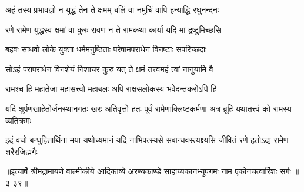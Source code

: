 \twolineshloka
{अहं तस्य प्रभावज्ञो न युद्धं तेन ते क्षमम्}
{बलिं वा नमुचिं वापि हन्याद्धि रघुनन्दनः} %

\twolineshloka
{रणे रामेण युद्धस्व क्षमां वा कुरु रावण}
{न ते रामकथा कार्या यदि मां द्रष्टुमिच्छसि} %

\twolineshloka
{बहवः साधवो लोके युक्ता धर्ममनुष्ठिताः}
{परेषामपराधेन विनष्टाः सपरिच्छदाः} %

\twolineshloka
{सोऽहं परापराधेन विनशेयं निशाचर}
{कुरु यत् ते क्षमं तत्त्वमहं त्वां नानुयामि वै} %

\twolineshloka
{रामश्च हि महातेजा महासत्त्वो महाबलः}
{अपि राक्षसलोकस्य भवेदन्तकरोऽपि हि} %

\threelineshloka
{यदि शूर्पणखाहेतोर्जनस्थानगतः खरः}
{अतिवृत्तो हतः पूर्वं रामेणाक्लिष्टकर्मणा}
{अत्र ब्रूहि यथातत्त्वं को रामस्य व्यतिक्रमः} %

\twolineshloka
{इदं वचो बन्धुहितार्थिना मया यथोच्यमानं यदि नाभिपत्स्यसे}
{सबान्धवस्त्यक्ष्यसि जीवितं रणे हतोऽद्य रामेण शरैरजिह्मगैः} %


॥इत्यार्षे श्रीमद्रामायणे वाल्मीकीये आदिकाव्ये अरण्यकाण्डे साहाय्यकानभ्युपगमः नाम एकोनचत्वारिंशः सर्गः ॥३-३९॥
